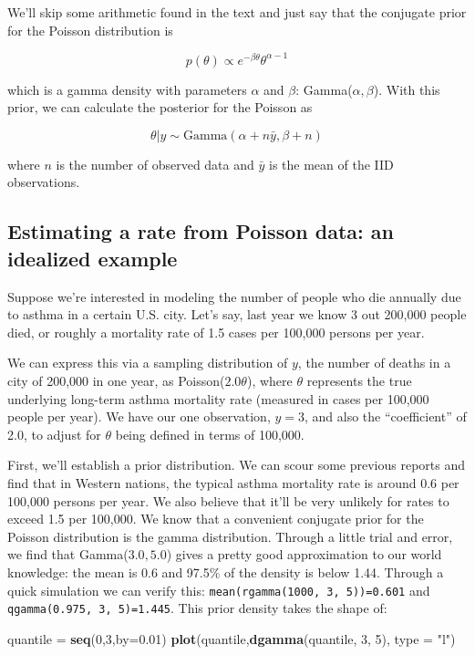 \documentclass[]{book}
\newenvironment{Shaded}{\begin{snugshade}}{\end{snugshade}}
\newcommand{\KeywordTok}[1]{\textcolor[rgb]{0.13,0.29,0.53}{\textbf{#1}}}
\newcommand{\DataTypeTok}[1]{\textcolor[rgb]{0.13,0.29,0.53}{#1}}
\newcommand{\DecValTok}[1]{\textcolor[rgb]{0.00,0.00,0.81}{#1}}
\newcommand{\FloatTok}[1]{\textcolor[rgb]{0.00,0.00,0.81}{#1}}
\newcommand{\StringTok}[1]{\textcolor[rgb]{0.31,0.60,0.02}{#1}}
\newcommand{\NormalTok}[1]{#1}
\begin{document}
We'll skip some arithmetic found in the text and just say that the
conjugate prior for the Poisson distribution is

\[
p(\theta) \propto e^{-\beta\theta}\theta^{\alpha-1}
\]

which is a gamma density with parameters \(\alpha\) and \(\beta\):
Gamma(\(\alpha,\beta\)). With this prior, we can calculate the posterior
for the Poisson as

\[
\theta|y \sim \text{Gamma}(\alpha+n\bar{y},\beta + n)
\]

where \(n\) is the number of observed data and \(\bar{y}\) is the mean
of the IID observations.

\subsection{Estimating a rate from Poisson data: an idealized
example}\label{estimating-a-rate-from-poisson-data-an-idealized-example}

Suppose we're interested in modeling the number of people who die
annually due to asthma in a certain U.S. city. Let's say, last year we
know 3 out 200,000 people died, or roughly a mortality rate of 1.5 cases
per 100,000 persons per year.

We can express this via a sampling distribution of \(y\), the number of
deaths in a city of 200,000 in one year, as Poisson(\(2.0\theta\)),
where \(\theta\) represents the true underlying long-term asthma
mortality rate (measured in cases per 100,000 people per year). We have
our one observation, \(y=3\), and also the ``coefficient'' of 2.0, to
adjust for \(\theta\) being defined in terms of 100,000.

First, we'll establish a prior distribution. We can scour some previous
reports and find that in Western nations, the typical asthma mortality
rate is around 0.6 per 100,000 persons per year. We also believe that
it'll be very unlikely for rates to exceed 1.5 per 100,000. We know that
a convenient conjugate prior for the Poisson distribution is the gamma
distribution. Through a little trial and error, we find that
Gamma(\(3.0,5.0\)) gives a pretty good approximation to our world
knowledge: the mean is 0.6 and 97.5\% of the density is below 1.44.
Through a quick simulation we can verify this:
\texttt{mean(rgamma(1000,\ 3,\ 5))=0.601} and
\texttt{qgamma(0.975,\ 3,\ 5)=1.445}. This prior density takes the shape
of:

\begin{Shaded}
\begin{Highlighting}[]
\NormalTok{quantile =}\StringTok{ }\KeywordTok{seq}\NormalTok{(}\DecValTok{0}\NormalTok{,}\DecValTok{3}\NormalTok{,}\DataTypeTok{by=}\FloatTok{0.01}\NormalTok{)}
\KeywordTok{plot}\NormalTok{(quantile,}\KeywordTok{dgamma}\NormalTok{(quantile, }\DecValTok{3}\NormalTok{, }\DecValTok{5}\NormalTok{), }\DataTypeTok{type =} \StringTok{"l"}\NormalTok{)}
\end{Highlighting}
\end{Shaded}
\end{document}
